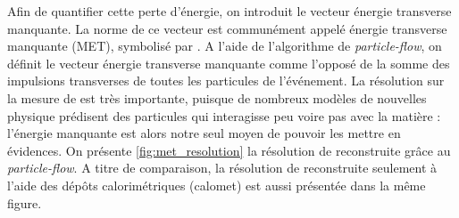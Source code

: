 Afin de quantifier cette perte d'énergie, on introduit le vecteur énergie transverse manquante. La norme de ce vecteur est communément appelé énergie transverse manquante (MET), symbolisé par \met. A l'aide de l'algorithme de \emph{particle-flow}, on définit le vecteur énergie transverse manquante comme l'opposé de la somme des impulsions transverses de toutes les particules de l'événement. La résolution sur la mesure de \met est très importante, puisque de nombreux modèles de nouvelles physique prédisent des particules qui interagisse peu voire pas avec la matière : l'énergie manquante est alors notre seul moyen de pouvoir les mettre en évidences. On présente \cref{fig:met_resolution} la résolution de \met reconstruite grâce au \emph{particle-flow}. A titre de comparaison, la résolution de \met reconstruite seulement à l'aide des dépôts calorimétriques (calomet) est aussi présentée dans la même figure.